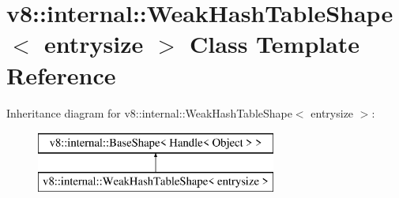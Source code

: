 \hypertarget{classv8_1_1internal_1_1_weak_hash_table_shape}{}\section{v8\+:\+:internal\+:\+:Weak\+Hash\+Table\+Shape$<$ entrysize $>$ Class Template Reference}
\label{classv8_1_1internal_1_1_weak_hash_table_shape}
Inheritance diagram for v8\+:\+:internal\+:\+:Weak\+Hash\+Table\+Shape$<$ entrysize $>$\+:\begin{figure}[H]
\begin{center}
\leavevmode
\includegraphics[height=2.000000cm]{classv8_1_1internal_1_1_weak_hash_table_shape}
\end{center}
\end{figure}
